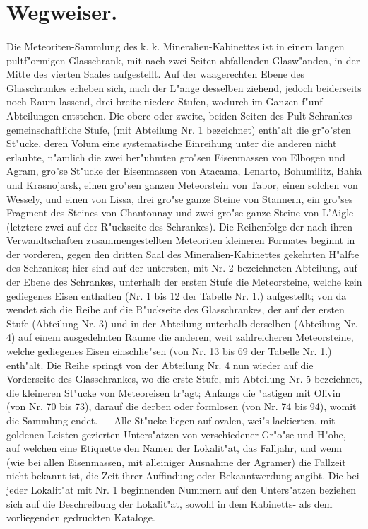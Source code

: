 \documentclass[a4paper, 11pt, oneside, polutonikogreek, german]{article}
\begin{document}
\section{Wegweiser.}
\paragraph{}
Die Meteoriten-Sammlung des k. k. Mineralien-Kabinettes ist in einem langen pultf"ormigen Glasschrank, mit nach zwei Seiten abfallenden Glasw"anden, in der Mitte des vierten Saales aufgestellt. Auf der waagerechten Ebene des Glasschrankes erheben sich, nach der L"ange desselben ziehend, jedoch beiderseits noch Raum lassend, drei breite niedere Stufen, wodurch im Ganzen f"unf Abteilungen entstehen. Die obere oder zweite, beiden Seiten des Pult-Schrankes gemeinschaftliche Stufe, (mit Abteilung Nr. 1 bezeichnet) enth"alt die gr"o"sten St"ucke, deren Volum eine systematische Einreihung unter die anderen nicht erlaubte, n"amlich die zwei ber"uhmten gro"sen Eisenmassen von Elbogen und Agram, gro"se St"ucke der Eisenmassen von Atacama, Lenarto, Bohumilitz, Bahia und Krasnojarsk, einen gro"sen ganzen Meteorstein von Tabor, einen solchen von Wessely, und einen von Lissa, drei gro"se ganze Steine von Stannern, ein gro"ses Fragment des Steines von Chantonnay und zwei gro"se ganze Steine von L’Aigle (letztere zwei auf der R"uckseite des Schrankes). Die Reihenfolge der nach ihren Verwandtschaften zusammengestellten Meteoriten kleineren Formates beginnt in der vorderen, gegen den dritten Saal des Mineralien-Kabinettes gekehrten H"alfte des Schrankes; hier sind auf der untersten, mit Nr. 2 bezeichneten Abteilung, auf der Ebene des Schrankes, unterhalb der ersten Stufe die Meteorsteine, welche kein gediegenes Eisen enthalten (Nr. 1 bis 12 der Tabelle Nr. 1.) aufgestellt; von da wendet sich die Reihe auf die R"uckseite des Glasschrankes, der auf der ersten Stufe (Abteilung Nr. 3) und in der Abteilung unterhalb derselben (Abteilung Nr. 4) auf einem ausgedehnten Raume die anderen, weit zahlreicheren Meteorsteine, welche gediegenes Eisen einschlie"sen (von Nr. 13 bis 69 der Tabelle Nr. 1.) enth"alt. Die Reihe springt von der Abteilung Nr. 4 nun wieder auf die Vorderseite des Glasschrankes, wo die erste Stufe, mit Abteilung Nr. 5 bezeichnet, die kleineren St"ucke von Meteoreisen tr"agt; Anfangs die "astigen mit Olivin (von Nr. 70 bis 73), darauf die derben oder formlosen (von Nr. 74 bis 94), womit die Sammlung endet. --- Alle St"ucke liegen auf ovalen, wei"s lackierten, mit goldenen Leisten gezierten Unters"atzen von verschiedener Gr"o"se und H"ohe, auf welchen eine Etiquette den Namen der Lokalit"at, das Falljahr, und wenn (wie bei allen Eisenmassen, mit alleiniger Ausnahme der Agramer) die Fallzeit nicht bekannt ist, die Zeit ihrer Auffindung oder Bekanntwerdung angibt. Die bei jeder Lokalit"at mit Nr. 1 beginnenden Nummern auf den Unters"atzen beziehen sich auf die Beschreibung der Lokalit"at, sowohl in dem Kabinetts- als dem vorliegenden gedruckten Kataloge.
\clearpage
\end{document}
